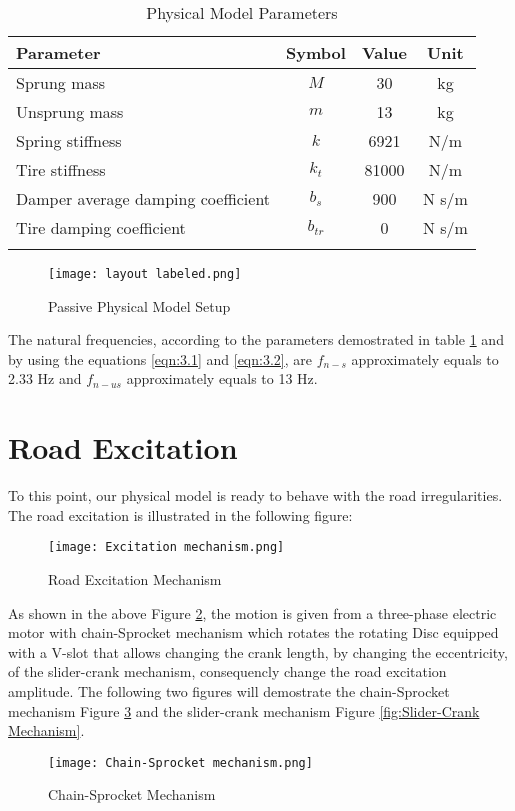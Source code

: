 \begin{table}[h]
    \centering
    \caption{Physical Model Parameters}
    \begin{tabular}{lccc}

        \hline
        \textbf{Parameter} & \textbf{Symbol} & \textbf{Value}  & \textbf{Unit}  \\
        \hline

        Sprung mass & \( M\)& 30 & kg\\
        Unsprung mass & \( m \)& 13 & kg\\
        Spring stiffness & \( k \)& 6921 & N/m\\ 
        Tire stiffness & \( k_{t} \)& 81000 & N/m\\
        Damper average damping coefficient & \( b_{s} \)& 900 & N s/m\\
        Tire damping coefficient & \( b_{tr} \)& 0 & N s/m\\

        \hline
        \label{table:Parameter}
    \end{tabular}
\end{table}
\begin{figure}[H]
    \centering
    \texttt{[image: layout labeled.png]}
    \caption{Passive Physical Model Setup}
    \label{fig:Passive layout}
\end{figure}
The natural frequencies, according to the parameters demostrated in table \ref{table:Parameter} and by using the equations  \ref{eqn:3.1} and \ref{eqn:3.2}, are \( f_{n-s} \)  approximately equals to 2.33 Hz and \( f_{n-{us}} \)  approximately equals to 13 Hz.






\newpage
\section{Road Excitation}
To this point, our physical model is ready to behave with the road irregularities.
The road excitation is illustrated in the following figure:
\begin{figure}[H]
    \centering
    \texttt{[image: Excitation mechanism.png]}
    \caption{Road Excitation Mechanism}
    \label{fig:Excitation mechanism}
\end{figure}
As shown in the above Figure \ref{fig:Excitation mechanism}, the motion is given from a three-phase electric motor with chain-Sprocket mechanism which rotates the rotating Disc equipped with a V-slot that allows changing the crank length, by changing the eccentricity, of the slider-crank mechanism, consequencly change the road excitation amplitude. The following two figures will demostrate the chain-Sprocket mechanism Figure \ref{fig:chain-Sprocket mechanism} and the slider-crank mechanism Figure \ref{fig:Slider-Crank Mechanism}.
\begin{figure}[H]
    \centering
    \texttt{[image: Chain-Sprocket mechanism.png]}
    \caption{Chain-Sprocket Mechanism}
    \label{fig:chain-Sprocket mechanism}
\end{figure}

